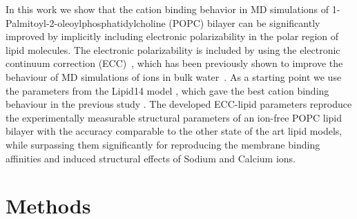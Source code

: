 \documentclass[aip,jcp,twocolumn]{revtex4}
\begin{document}



In this work we show that the cation binding behavior
in MD simulations of 1-Palmitoyl-2-oleoylphosphatidylcholine (POPC) bilayer can be significantly 
improved by implicitly including electronic polarizability
in the polar region of lipid molecules. The electronic
polarizability is included by using the electronic
continuum correction (ECC)~\cite{leontyev11}, which
has been previously shown to improve the behaviour of
MD simulations of ions in bulk water~\cite{jungwirth17-new-paper-to-be-published,Pluharova2014,kohagen14,kohagen16}. 
As a starting point we use the parameters from the Lipid14 model \cite{dickson14},
which gave the best cation binding behaviour in the previous study \cite{catte16}.
The developed ECC-lipid parameters reproduce the experimentally
measurable structural parameters of an ion-free POPC lipid bilayer with the 
accuracy comparable to the other state of the art lipid models, while surpassing
them significantly for reproducing the membrane binding affinities and induced
structural effects of Sodium and Calcium ions.




\section{Methods}
\end{document}
